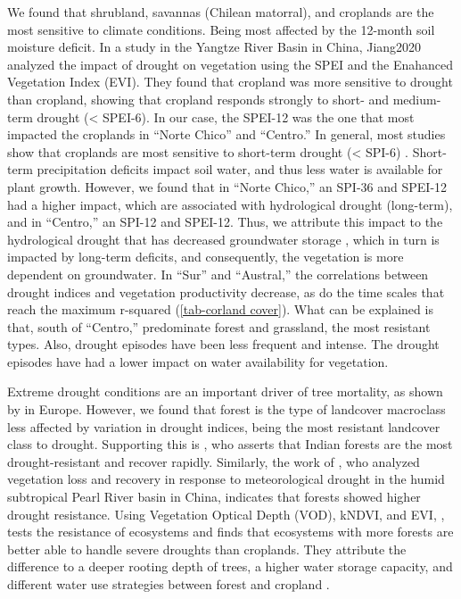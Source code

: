 \documentclass[
  number,
  preprint,
  3p,
  onecolumn]{elsarticle}
\begin{document}
We found that shrubland, savannas (Chilean matorral), and croplands are
the most sensitive to climate conditions. Being most affected by the
12-month soil moisture deficit. In a study in the Yangtze River Basin in
China, Jiang2020 analyzed the impact of drought on vegetation using the
SPEI and the Enahanced Vegetation Index (EVI). They found that cropland
was more sensitive to drought than cropland, showing that cropland
responds strongly to short- and medium-term drought (\textless{}
SPEI-6). In our case, the SPEI-12 was the one that most impacted the
croplands in ``Norte Chico'' and ``Centro.'' In general, most studies
show that croplands are most sensitive to short-term drought
(\textless{} SPI-6) \citep{Zambrano2016, Potopova2015, Dai2020}.
Short-term precipitation deficits impact soil water, and thus less water
is available for plant growth. However, we found that in ``Norte
Chico,'' an SPI-36 and SPEI-12 had a higher impact, which are associated
with hydrological drought (long-term), and in ``Centro,'' an SPI-12 and
SPEI-12. Thus, we attribute this impact to the hydrological drought that
has decreased groundwater storage \citep{Taucare2024}, which in turn is
impacted by long-term deficits, and consequently, the vegetation is more
dependent on groundwater. In ``Sur'' and ``Austral,'' the correlations
between drought indices and vegetation productivity decrease, as do the
time scales that reach the maximum r-squared (\ref{tab-corland cover}).
What can be explained is that, south of ``Centro,'' predominate forest
and grassland, the most resistant types. Also, drought episodes have
been less frequent and intense. The drought episodes have had a lower
impact on water availability for vegetation.

Extreme drought conditions are an important driver of tree mortality, as
shown by \citep{Senf2020} in Europe. However, we found that forest is
the type of landcover macroclass less affected by variation in drought
indices, being the most resistant landcover class to drought. Supporting
this is \citep{Fathi-Taperasht2022}, who asserts that Indian forests are
the most drought-resistant and recover rapidly. Similarly, the work of
\citep{Wu2024}, who analyzed vegetation loss and recovery in response to
meteorological drought in the humid subtropical Pearl River basin in
China, indicates that forests showed higher drought resistance. Using
Vegetation Optical Depth (VOD), kNDVI, and EVI, \citep{Xiao2023}, tests
the resistance of ecosystems and finds that ecosystems with more forests
are better able to handle severe droughts than croplands. They attribute
the difference to a deeper rooting depth of trees, a higher water
storage capacity, and different water use strategies between forest and
cropland \citep{Xiao2023}.
\end{document}
